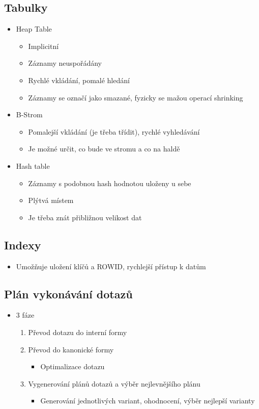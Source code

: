 \documentclass[openany]{book}
\begin{document}
\subsection{Tabulky}
\begin{itemize}
    \item Heap Table
    \begin{itemize}
        \item Implicitní
        \item Záznamy neuspořádány
        \item Rychlé vkládání, pomalé hledání
        \item Záznamy se označí jako smazané, fyzicky se mažou operací shrinking
    \end{itemize}
    \item B-Strom
    \begin{itemize}
        \item Pomalejší vkládání (je třeba třídit), rychlé vyhledávání
        \item Je možné určit, co bude ve stromu a co na haldě
    \end{itemize}
    \item Hash table
    \begin{itemize}
        \item Záznamy s podobnou hash hodnotou uloženy u sebe
        \item Plýtvá místem
        \item Je třeba znát přibližnou velikost dat
    \end{itemize}
\end{itemize}

\subsection{Indexy}
\begin{itemize}
    \item Umožňuje uložení klíčů a ROWID, rychlejší přístup k datům
\end{itemize}
\subsection{Plán vykonávání dotazů}
\begin{itemize}
    \item 3 fáze
    \begin{enumerate}
        \item Převod dotazu do interní formy
        \item Převod do kanonické formy
        \begin{itemize}
            \item Optimalizace dotazu
        \end{itemize}
        \item Vygenerování plánů dotazů a výběr nejlevnějšího plánu
        \begin{itemize}
            \item Generování jednotlivých variant, ohodnocení, výběr nejlepší varianty
        \end{itemize}
    \end{enumerate}
\end{itemize}
\end{document}
